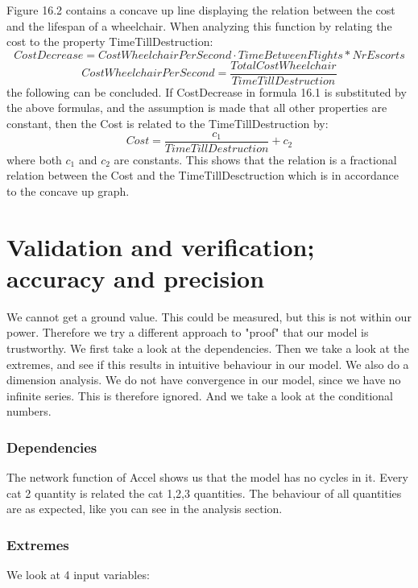 \documentclass[a4paper, 11pt, notitlepage]{report}
\begin{document}
Figure 16.2 contains a concave up line displaying the relation between the cost and the lifespan of a wheelchair. When analyzing this function by relating the cost to the property TimeTillDestruction:
\begin{equation}
CostDecrease = CostWheelchairPerSecond \cdot TimeBetweenFlights*NrEscorts
\end{equation}
\begin{equation}
CostWheelchairPerSecond= \frac{TotalCostWheelchair}{TimeTillDestruction}
\end{equation}
the following can be concluded. If CostDecrease in formula 16.1 is substituted by the above formulas, and the assumption is made that all other properties are constant, then the Cost is related to the TimeTillDestruction by:
\begin{equation}
Cost = \frac{c_1}{TimeTillDestruction}+ c_2
\end{equation}
where both $c_1$ and $c_2$ are constants. This shows that the relation is a fractional relation between the Cost and the TimeTillDesctruction which is in accordance to the concave up graph.\\

\chapter{Validation and verification; accuracy and precision}
We cannot get a ground value. This could be measured, but this is not within our power. Therefore we try a different approach to "proof" that our model is trustworthy. We first take a look at the dependencies. Then we take a look at the extremes, and see if this results in intuitive behaviour in our model. We also do a dimension analysis. We do not have convergence in our model, since we have no infinite series. This is therefore ignored. And we take a look at the conditional numbers.

\subsection{Dependencies} The network function of Accel shows us that the model has no cycles in it. Every cat 2 quantity is related the cat 1,2,3 quantities. The behaviour of all quantities are as expected, like you can see in the analysis section.

\subsection{Extremes} We look at 4 input variables:
\end{document}
